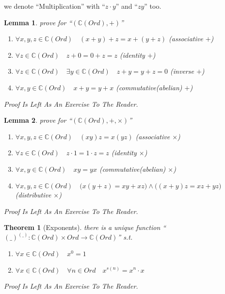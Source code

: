 \documentclass[10pt,a4paper]{book}
\newtheorem{theorem}{Theorem}[section]
\newtheorem{lemma}{Lemma}[section]
\begin{document}
we denote ``Multiplication'' with ``$z \cdot y$'' and ``$z y$'' too.

\begin{lemma}prove for  ``$ (\mathbb{C} (Ord) , +  )  $''
    \begin{enumerate}
        \setlength{\itemsep}{0pt} %
        \item       $\forall x ,y ,z  \in \mathbb{C} (Ord) \quad (x + y )+ z  = x + (y + z )  $ (associative $+ $)
        \item       $\forall z \in \mathbb{C} (Ord) \quad z +  0 = 0 +  z = z$ (identity  $+ $)
        \item       $\forall z \in \mathbb{C} (Ord) \quad \exists y \in \mathbb{C} (Ord) \quad z +  y = y +  z = 0$  (inverse  $+ $)
        \item       $\forall x ,y  \in \mathbb{C} (Ord) \quad x + y  = y + x $   (commutative(abelian)  $+ $)
    \end{enumerate}
    Proof Is Left As An Exercise To The Reader.
\end{lemma}

\begin{lemma}prove for  ``$ (\mathbb{C} (Ord) , + , \times )  $''
    \begin{enumerate}
        \setlength{\itemsep}{0pt} %
        \item       $\forall x ,y ,z  \in \mathbb{C} (Ord) \quad (x   y )  z  = x  (y   z )  $ (associative $\times$)
        \item       $\forall z \in \mathbb{C} (Ord) \quad z \cdot 1 = 1 \cdot  z = z$ (identity  $\times$)
        \item       $\forall x ,y  \in \mathbb{C} (Ord) \quad x   y  = y   x $  (commutative(abelian)  $\times$)
        \item       $\forall x ,y ,z  \in \mathbb{C} (Ord) \quad \Big(x   (y  + z ) = x   y  +  x   z  \Big)
                  \land     \Big((x  + y )  z  = x   z  +  y   z  \Big)  $ (distributive $\times$)
    \end{enumerate}
    Proof Is Left As An Exercise To The Reader.
\end{lemma}

\begin{theorem}[Exponents] there is a unique function ``$(\_)^{(\_)} :\mathbb{C} (Ord) \times Ord \to \mathbb{C} (Ord)$'' s.t.

    \begin{enumerate}
        \setlength{\itemsep}{0pt} %
        \item       $\forall x \in \mathbb{C} (Ord) \quad x ^ 0 = 1$
        \item       $\forall x \in \mathbb{C} (Ord) \quad \forall n \in Ord \quad  x ^ {s(n)} = x ^ n \cdot x   $
    \end{enumerate}
    Proof Is Left As An Exercise To The Reader.
\end{theorem}
\end{document}
